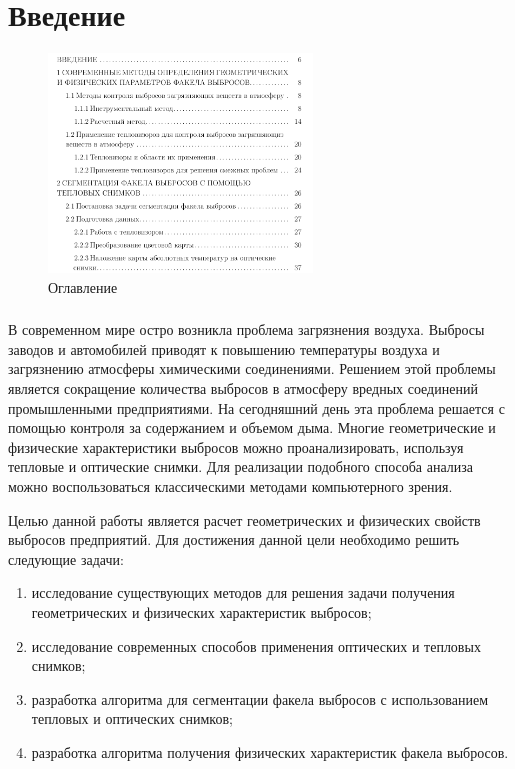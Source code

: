 \documentclass[t]{beamer}
\begin{document}
	
	\firstpage
	\justifying
\section{Введение}
	\begin{frame}
		\begin{figure}
			\centering
			\includegraphics[width = 7cm]{image/ToC}
			\caption{Оглавление}
		\end{figure}
	\end{frame}

	\begin{frame}
		\frametitle{\insertsection} 
		В современном мире остро возникла проблема загрязнения воздуха. Выбросы заводов и автомобилей приводят к повышению температуры воздуха и загрязнению атмосферы химическими соединениями. Решением этой проблемы является сокращение количества выбросов в атмосферу вредных соединений промышленными предприятиями. На сегодняшний день эта проблема решается с помощью контроля за содержанием и объемом дыма. Многие геометрические и физические характеристики выбросов можно проанализировать, используя тепловые и оптические снимки. Для реализации подобного способа анализа можно воспользоваться классическими методами компьютерного зрения.
	\end{frame}

	\begin{frame}
		Целью данной работы является расчет геометрических и физических свойств выбросов предприятий. Для достижения данной цели необходимо решить следующие задачи:
		\begin{enumerate}
			\justifying
			\item исследование существующих методов для решения задачи получения геометрических и физических характеристик выбросов;
			\item исследование современных способов применения оптических и тепловых снимков;
			\item разработка алгоритма для сегментации факела выбросов с использованием тепловых и оптических снимков;
			\item разработка алгоритма получения физических характеристик факела выбросов.
		\end{enumerate}
	\end{frame}
\end{document}
